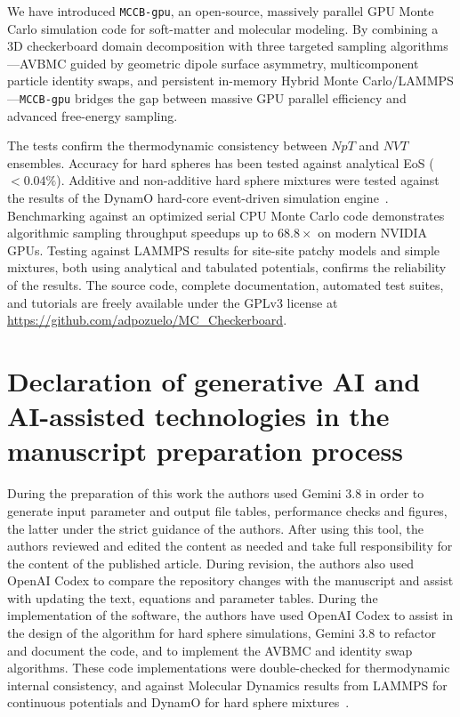 \documentclass[final,5p,times,twocolumn]{elsarticle}
\begin{document}
We have introduced \texttt{MCCB-gpu}, an open-source, massively
parallel GPU Monte Carlo simulation code for soft-matter and molecular
modeling. By combining a 3D checkerboard domain decomposition with
three targeted sampling algorithms—AVBMC guided by geometric dipole
surface asymmetry, multicomponent particle identity swaps, and
persistent in-memory Hybrid Monte Carlo/LAMMPS—\texttt{MCCB-gpu}
bridges the gap between massive GPU parallel efficiency and advanced
free-energy sampling.  

The tests confirm the thermodynamic consistency between
$NpT$ and $NVT$ ensembles. Accuracy for hard spheres has been tested
against analytical EoS ($< 0.04\%$). Additive and non-additive hard
sphere mixtures were tested against the results of the DynamO
hard-core event-driven simulation engine~\cite{bannerman2011dynamo}. 
Benchmarking against an optimized serial CPU
Monte Carlo code demonstrates algorithmic sampling throughput speedups
up to $\mathbf{68.8\times}$ on modern NVIDIA GPUs. Testing against
LAMMPS results for site-site patchy models and simple mixtures, both
using analytical and tabulated potentials, confirms the reliability of
the results. The source code,
complete documentation, automated test suites, and tutorials are
freely available under the GPLv3 license at
\url{https://github.com/adpozuelo/MC_Checkerboard}. 

\section{Declaration of generative AI and AI-assisted technologies in
  the manuscript preparation process} 

During the preparation of this work the authors used Gemini 3.8 in
order to generate input parameter and output file tables, performance
checks and figures, the latter under the strict guidance of the
authors. After using this tool, the authors 
reviewed and edited the content as needed and take full
responsibility for the content of the published article. During
revision, the authors also used OpenAI Codex to compare the repository
changes with the manuscript and assist with updating the text,
equations and parameter tables. During the implementation of the
software, the authors have used OpenAI Codex to assist in the design
of the algorithm for hard sphere simulations, Gemini 3.8 to refactor
and document the code, and to implement the AVBMC and identity swap
algorithms. These code implementations were double-checked for
thermodynamic internal consistency, and against Molecular Dynamics
results from LAMMPS for continuous potentials and DynamO for hard
sphere mixtures~\cite{bannerman2011dynamo}.
\end{document}
